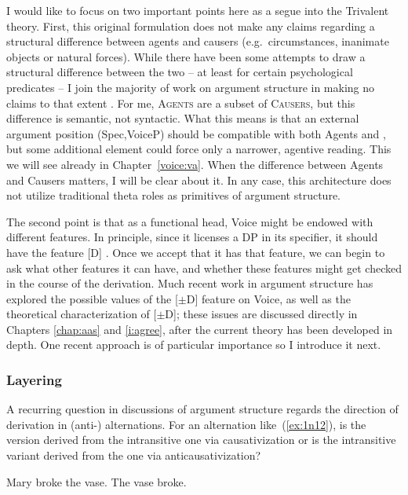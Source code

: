 \begin{exe}
\begin{xlist}
\begin{exe}
\begin{exe}
\begin{exe}
\begin{exe}
\begin{xlist}
\begin{exe}
\begin{xlist}
\begin{xlist}
\begin{xlist}
\begin{exe}
\begin{xlist}
\begin{exe}
\begin{exe}
\begin{xlist}
I would like to focus on two important points here as a segue into the Trivalent theory. First, this original formulation does not make any claims regarding a structural difference between agents and causers (e.g.~circumstances, inanimate objects or natural forces). While there have been some attempts to draw a structural difference between the two -- at least for certain psychological predicates \citep{bellettirizzi88,harleystone13} -- I join the majority of work on argument structure in making no claims to that extent \citep[7]{layering15}. For me, \textsc{Agents} are a subset of \textsc{Causers}, but this difference is semantic, not syntactic. What this means is that an external argument position (Spec,VoiceP) should be compatible with both Agents and , but some additional element could force only a narrower, agentive reading. This we will see already in Chapter~\ref{voice:va}. When the difference between Agents and Causers matters, I will be clear about it. In any case, this architecture does not utilize traditional theta roles as primitives of argument structure.

The second point is that as a functional head, Voice might be endowed with different features. In principle, since it licenses a DP in its specifier, it should have the  feature [D] \citep{chomsky95}. Once we accept that it has that feature, we can begin to ask what other features it can have, and whether these features might get checked in the course of the derivation. Much recent work in argument structure has explored the possible values of the [$\pm$D] feature on Voice, as well as the theoretical characterization of [$\pm$D]; these issues are discussed directly in Chapters \ref{chap:aas} and \ref{i:agree}, after the current theory has been developed in depth. One recent approach is of particular importance so I introduce it next.\label{r1:g:2a1}

		\subsubsection{Layering} \label{intro:arch:layering}
A recurring question in discussions of argument structure regards the direction of derivation in (anti-) alternations. For an alternation like~(\ref{ex:1n12}), is the  version derived from the intransitive one via causativization or is the intransitive variant derived from the  one via anticausativization?
 \begin{exe}
 \ex  \label{ex:1n12}
 \begin{xlist} 
 	\ex  Mary broke the vase. 
 	\ex  The vase broke. 
 \z
\z 


\end{xlist}
\end{exe}
\end{xlist}
\end{exe}
\end{exe}
\end{xlist}
\end{exe}
\end{xlist}
\end{xlist}
\end{xlist}
\end{exe}
\end{xlist}
\end{exe}
\end{exe}
\end{exe}
\end{exe}
\end{xlist}
\end{exe}
